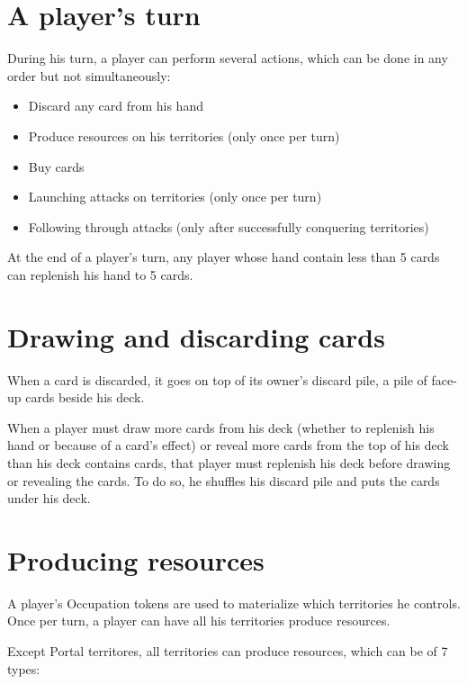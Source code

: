 \documentclass[a4paper]{article}
\begin{document}
\newpage
\section{A player's turn}

    During his turn, a player can perform several actions, which can be done in any order but not simultaneously:

    \begin{itemize}
        \item Discard any card from his hand
        \item Produce resources on his territories (only once per turn)
        \item Buy cards
        \item Launching attacks on territories (only once per turn)
        \item Following through attacks (only after successfully conquering territories)
    \end{itemize}

    At the end of a player's turn, any player whose hand contain less than 5 cards can replenish his hand to 5 cards.



\section{Drawing and discarding cards}

    When a card is discarded, it goes on top of its owner's discard pile, a pile of face-up cards beside his deck.

    When a player must draw more cards from his deck (whether to replenish his hand or because of a card's effect)
    or reveal more cards from the top of his deck than his deck contains cards, that player must replenish his deck before
    drawing or revealing the cards.
    To do so, he shuffles his discard pile and puts the cards under his deck.



\section{Producing resources}

    A player's Occupation tokens are used to materialize which territories he controls.
    Once per turn, a player can have all his territories produce resources.

    Except Portal territores, all territories can produce resources, which can be of 7 types:
\end{document}
